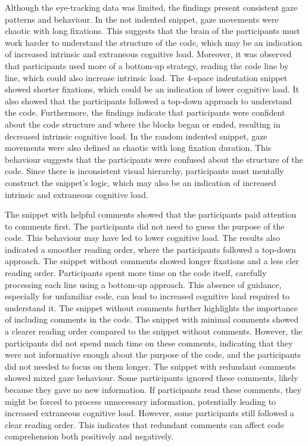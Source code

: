 Although the eye-tracking data was limited, the findings present consistent gaze patterns and behaviour. In the not indented snippet, gaze movements were chaotic with long fixations. This suggests that the brain of the participants must work harder to understand the structure of the code, which may be an indication of increased intrinsic and extraneous cognitive load. Moreover, it was observed that participants used more of a bottom-up strategy, reading the code line by line, which could also increase intrinsic load.
The 4-space indentation snippet showed shorter fixations, which could be an indication of lower cognitive load. It also showed that the participants followed a top-down approach to understand the code. Furthermore, the findings indicate that participants were confident about the code structure and where the blocks began or ended, resulting in decreased intrinsic cognitive load.      
In the random indented snippet, gaze movements were also defined as chaotic with long fixation duration. This behaviour suggests that the participants were confused about the structure of the code. Since there is inconsistent visual hierarchy, participants must mentally construct the snippet’s logic, which may also be an indication of increased intrinsic and extraneous cognitive load.    

The snippet with helpful comments showed that the participants paid attention to comments first.   The participants did not need to guess the purpose of the code. This behaviour may have led to lower cognitive load.  The results also indicated a smoother reading order, where the participants followed a top-down approach.
The snippet without comments showed longer fixations and a less cler reading order.  Participants spent more time on the code itself, carefully processing each line using a bottom-up approach. This absence of guidance, especially for unfamiliar code, can lead to increased cognitive load required to understand it.  The snippet without comments further highlights the importance of including comments in the code. The snippet with minimal comments showed a clearer reading order compared to the snippet without comments. However, the participants did not spend much time on these comments, indicating that they were not informative enough about the purpose of the code, and the participants did not needed to focus on them longer. 
The snippet with redundant comments showed mixed gaze behaviour.  Some participants ignored these comments, likely because they gave no new information. If participants read these comments, they might be forced to process unnecessary information, potentially leading to increased extraneous cognitive load.  However, some participants still followed a clear reading order. This indicates that redundant comments can affect code comprehension both positively and negatively.  




